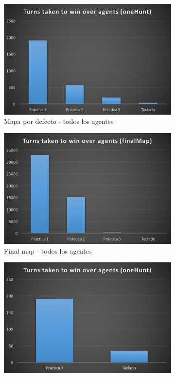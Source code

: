 \documentclass[12pt]{article}
\begin{document}
\begin{figure}[h]
    \centering
    \begin{subfigure}{.5\textwidth}
        \centering
        \includegraphics[width=.85\linewidth]{bmap_c}
        \caption{Mapa por defecto - todos los agentes}
        \label{fig:sub1}
    \end{subfigure}%
    \begin{subfigure}{.5\textwidth}
        \centering
        \includegraphics[width=.85\linewidth]{fmap_c}
        \caption{Final map - todos los agentes}
        \label{fig:sub2}
    \end{subfigure}
    \begin{subfigure}{.5\textwidth}
        \centering
        \includegraphics[width=.85\linewidth]{bmap_d}

\end{subfigure}
\end{figure}
\end{document}
